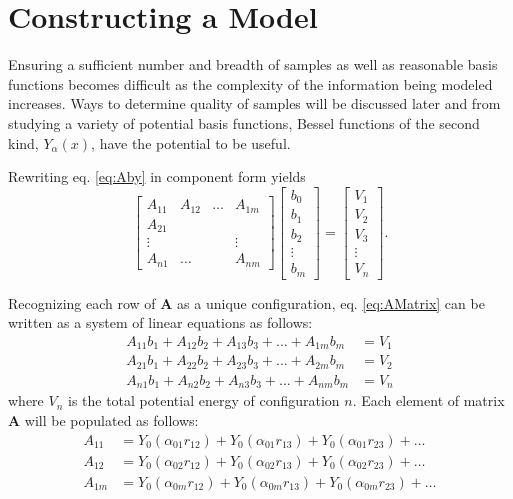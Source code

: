 \section{Constructing a Model}\label{Sect:LJModels}
\par Ensuring a sufficient number and breadth of samples as well as reasonable basis functions becomes difficult as the complexity of the information being modeled increases. Ways to determine quality of samples will be discussed later and from studying a variety of potential basis functions, Bessel functions of the second kind, $Y_\alpha(x)$, have the potential to be useful.
\par Rewriting eq. \ref{eq:Aby} in component form yields
\begin{equation}
\begin{bmatrix}
A_{11} & A_{12} & \ldots & A_{1m} \\
A_{21} \\
\vdots & & & \vdots\\
A_{n1} & \ldots & & A_{nm}
\end{bmatrix}
\begin{bmatrix}
b_0 \\
b_1 \\
b_2 \\
\vdots \\
b_m 
\end{bmatrix}
=
\begin{bmatrix}
V_1 \\
V_2 \\
V_3 \\ 
\vdots \\
V_n
\end{bmatrix}.
\label{eq:AMatrix}
\end{equation}
\par Recognizing each row of $\mathbf{A}$ as a unique configuration, eq. \ref{eq:AMatrix} can be written as a system of linear equations as follows:
\begin{align}
A_{11}b_1 + A_{12}b_2 + A_{13}b_3 + ... + A_{1m}b_m &= V_1 \nonumber \\
A_{21}b_1 + A_{22}b_2 + A_{23}b_3 + ... + A_{2m}b_m &= V_2 \nonumber \\
A_{n1}b_1 + A_{n2}b_2 + A_{n3}b_3 + ... + A_{nm}b_m &= V_n
\end{align}
where $V_n$ is the total potential energy of configuration $n$. Each element of matrix $\mathbf{A}$ will be populated as follows:
\begin{align}
A_{11} &= Y_0(\alpha_{01} r_{12}) + Y_0(\alpha_{01} r_{13}) + Y_0(\alpha_{01} r_{23}) + \ldots \nonumber \\
A_{12} &= Y_0(\alpha_{02} r_{12}) + Y_0(\alpha_{02} r_{13}) + Y_0(\alpha_{02} r_{23}) + \ldots \nonumber \\
A_{1m} &= Y_0(\alpha_{0m} r_{12}) + Y_0(\alpha_{0m} r_{13}) + Y_0(\alpha_{0m} r_{23}) + \ldots \label{eq:fillBessel}
\end{align}
